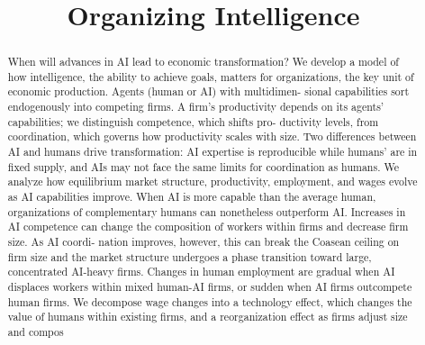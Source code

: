 \title{Organizing Intelligence}

\maketitle

\begin{abstract}
When will advances in AI lead to economic transformation? We develop a model of how intelligence, the ability to achieve goals, matters for organizations, the key unit of economic production. Agents (human or AI) with multidimen- sional capabilities sort endogenously into competing firms. A firm’s productivity depends on its agents’ capabilities; we distinguish competence, which shifts pro- ductivity levels, from coordination, which governs how productivity scales with size. Two differences between AI and humans drive transformation: AI expertise is reproducible while humans’ are in fixed supply, and AIs may not face the same limits for coordination as humans. We analyze how equilibrium market structure, productivity, employment, and wages evolve as AI capabilities improve. When AI is more capable than the average human, organizations of complementary humans can nonetheless outperform AI. Increases in AI competence can change the composition of workers within firms and decrease firm size. As AI coordi- nation improves, however, this can break the Coasean ceiling on firm size and the market structure undergoes a phase transition toward large, concentrated AI-heavy firms. Changes in human employment are gradual when AI displaces workers within mixed human-AI firms, or sudden when AI firms outcompete human firms. We decompose wage changes into a technology effect, which changes the value of humans within existing firms, and a reorganization effect as firms adjust size and compos
\end{abstract}

